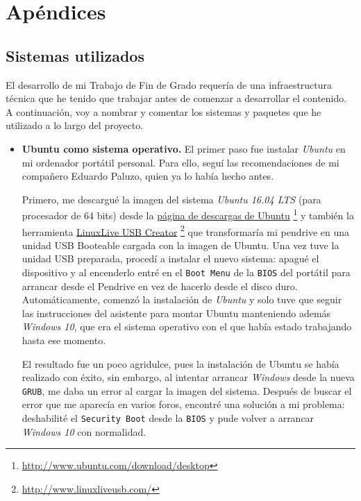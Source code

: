 \chapter{Apéndices}

\section {Sistemas utilizados}

El desarrollo de mi Trabajo de Fin de Grado requería de una infraestructura
técnica que he tenido que trabajar antes de comenzar a desarrollar el contenido.
A continuación, voy a nombrar y comentar los sistemas y paquetes que he 
utilizado a lo largo del proyecto. 

\begin{itemize}
  \item \textbf{Ubuntu como sistema operativo.} El primer paso fue instalar
    \textit{Ubuntu} en mi ordenador portátil personal. Para ello, seguí las 
    recomendaciones de mi compañero Eduardo Paluzo, quien ya lo había hecho 
    antes. 

    Primero, me descargué la imagen del sistema \textit{Ubuntu 16.04 LTS} (para 
    procesador de 64 bits) desde la 
    \href{http://www.ubuntu.com/download/desktop}
    {página de descargas de Ubuntu}
    \footnote{\url{http://www.ubuntu.com/download/desktop}} y también la
    herramienta 
    \href{http://www.linuxliveusb.com/}
    {LinuxLive USB Creator}
    \footnote{\url{http://www.linuxliveusb.com/}} 
    que transformaría mi pendrive en una unidad USB Booteable cargada con la
    imagen de Ubuntu. Una vez tuve la unidad USB preparada, procedí a instalar
    el nuevo sistema: apagué el dispositivo y al encenderlo entré en el  
    \texttt{Boot Menu} de la  \texttt{BIOS} del portátil para arrancar desde el
    Pendrive en vez de hacerlo desde el disco duro. 
    Automáticamente, comenzó la instalación de  \textit{Ubuntu} y solo tuve que
    seguir las instrucciones del asistente para montar Ubuntu manteniendo además
    \textit{Windows 10}, que era el sistema operativo con el que había estado 
    trabajando hasta ese momento.
    
    El resultado fue un poco agridulce, pues la instalación de Ubuntu se había
    realizado con éxito, sin embargo, al intentar arrancar  \textit{Windows} 
    desde la nueva \texttt{GRUB}, me daba un error al cargar la imagen del 
    sistema. Después de buscar el error que me aparecía en varios foros, 
    encontré una solución a mi problema: deshabilité el  \texttt{Security Boot} 
    desde la  \texttt{BIOS} y pude volver a arrancar  \textit{Windows 10} con 
    normalidad.


\end{itemize}
